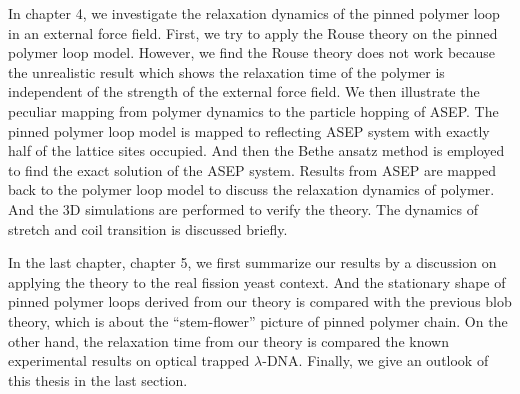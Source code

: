 In chapter 4, we investigate the relaxation dynamics of the pinned polymer loop in an external force field. First, we try to apply the Rouse theory on the pinned polymer loop model. However, we find the Rouse theory does not work because the unrealistic result which shows the relaxation time of the polymer is independent of the strength of the external force field. We then illustrate the peculiar mapping from polymer dynamics to the particle hopping of ASEP. The pinned polymer loop model is mapped to reflecting ASEP system with exactly half of the lattice sites occupied. And then the Bethe ansatz method is employed to find the exact solution of the ASEP system. Results from ASEP are mapped back to the polymer loop model to discuss the relaxation dynamics of polymer. And the 3D simulations are performed to verify the theory. The dynamics of stretch and coil transition is discussed briefly.

In the last chapter, chapter 5, we first summarize our results by a discussion on applying the theory to the real fission yeast context. And the stationary shape of pinned polymer loops derived from our theory is compared with the previous blob theory, which is about the ``stem-flower'' picture of pinned polymer chain. On the other hand, the relaxation time from our theory is compared the known experimental results on optical trapped $\lambda$-DNA. Finally, we give an outlook of this thesis in the last section.







